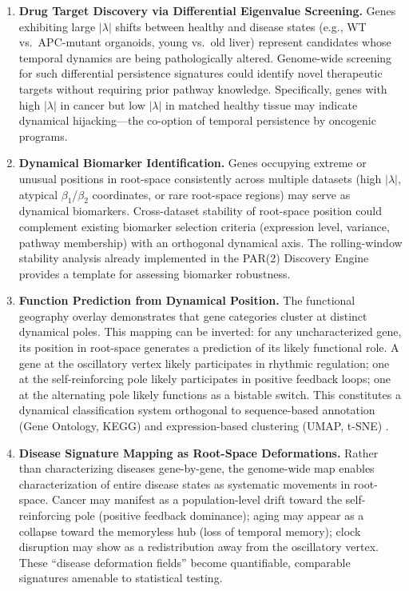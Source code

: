 \documentclass[11pt,letterpaper]{article}
\begin{document}
\begin{enumerate}[leftmargin=*, label=\textbf{\arabic*.}]

\item \textbf{Drug Target Discovery via Differential Eigenvalue Screening.}
Genes exhibiting large $|\lambda|$ shifts between healthy and disease states (e.g., WT vs.\ APC-mutant organoids, young vs.\ old liver) represent candidates whose temporal dynamics are being pathologically altered. Genome-wide screening for such differential persistence signatures could identify novel therapeutic targets without requiring prior pathway knowledge. Specifically, genes with high $|\lambda|$ in cancer but low $|\lambda|$ in matched healthy tissue may indicate dynamical hijacking---the co-option of temporal persistence by oncogenic programs.

\item \textbf{Dynamical Biomarker Identification.}
Genes occupying extreme or unusual positions in root-space consistently across multiple datasets (high $|\lambda|$, atypical $\beta_1$/$\beta_2$ coordinates, or rare root-space regions) may serve as dynamical biomarkers. Cross-dataset stability of root-space position could complement existing biomarker selection criteria (expression level, variance, pathway membership) with an orthogonal dynamical axis. The rolling-window stability analysis already implemented in the PAR(2) Discovery Engine provides a template for assessing biomarker robustness.

\item \textbf{Function Prediction from Dynamical Position.}
The functional geography overlay demonstrates that gene categories cluster at distinct dynamical poles. This mapping can be inverted: for any uncharacterized gene, its position in root-space generates a prediction of its likely functional role. A gene at the oscillatory vertex likely participates in rhythmic regulation; one at the self-reinforcing pole likely participates in positive feedback loops; one at the alternating pole likely functions as a bistable switch. This constitutes a dynamical classification system orthogonal to sequence-based annotation (Gene Ontology, KEGG) and expression-based clustering (UMAP, t-SNE) \citep{vandermaaten2008}.

\item \textbf{Disease Signature Mapping as Root-Space Deformations.}
Rather than characterizing diseases gene-by-gene, the genome-wide map enables characterization of entire disease states as systematic movements in root-space. Cancer may manifest as a population-level drift toward the self-reinforcing pole (positive feedback dominance); aging may appear as a collapse toward the memoryless hub (loss of temporal memory); clock disruption may show as a redistribution away from the oscillatory vertex. These ``disease deformation fields'' become quantifiable, comparable signatures amenable to statistical testing.


\end{enumerate}
\end{document}
